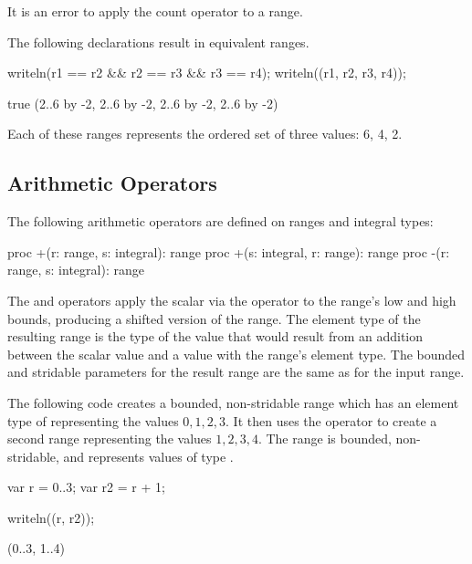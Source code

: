 It is an error to apply the count operator to a
 range.

\begin{example}
The following declarations result in equivalent ranges.
\begin{chapelpre}
\end{chapelpre}
\begin{chapelpost}
writeln(r1 == r2 \&\& r2 == r3 \&\& r3 == r4);
writeln((r1, r2, r3, r4));
\end{chapelpost}
\begin{chapeloutput}
true
(2..6 by -2, 2..6 by -2, 2..6 by -2, 2..6 by -2)
\end{chapeloutput}
Each of these ranges represents the ordered set of three values: 6, 4, 2.
\end{example}

\subsection{Arithmetic Operators}
\label{Range_Arithmetic}

The following arithmetic operators are defined on ranges and integral
types:

\begin{chapel}
proc +(r: range, s: integral): range
proc +(s: integral, r: range): range
proc -(r: range, s: integral): range
\end{chapel}

The \chpl{+} and \chpl{-} operators apply the scalar via the operator
to the range's low and high bounds, producing a shifted version of the
range.  The element type of the resulting range is the type of the value
that would result from an addition between the scalar value and a value
with the range's element type.  The bounded and stridable parameters for
the result range are the same as for the input range.

\begin{example}
The following code creates a bounded, non-stridable range 
which has an element type of  representing the values ${0,
  1, 2, 3}$.  It then uses the \chpl{+} operator to
create a second range  representing the values ${1, 2, 3,
  4}$.  The  range is bounded, non-stridable, and represents
values of type .
\begin{chapelpre}
\end{chapelpre}
\begin{chapel}
var r = 0..3;
var r2 = r + 1;
\end{chapel}
\begin{chapelpost}
writeln((r, r2));
\end{chapelpost}
\begin{chapeloutput}
(0..3, 1..4)
\end{chapeloutput}
\end{example}


